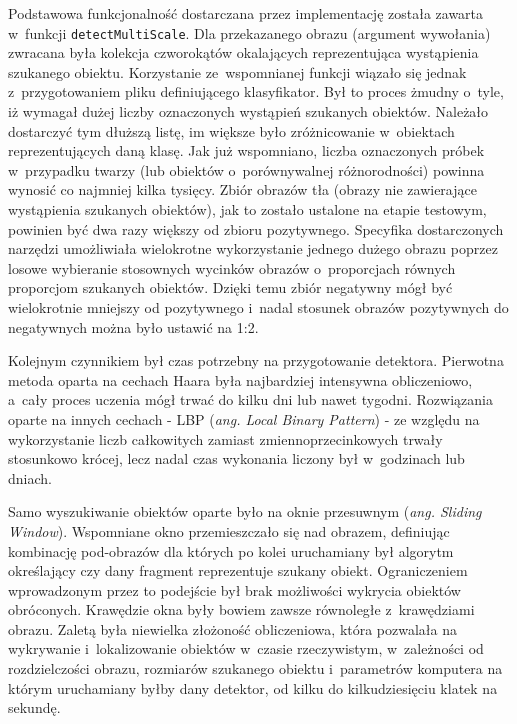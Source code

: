 Podstawowa funkcjonalność dostarczana przez implementację została zawarta
w~funkcji \verb|detectMultiScale|\cite{OCV:cascadeclassification}.
Dla przekazanego obrazu (argument wywołania)
zwracana była kolekcja czworokątów okalających
reprezentująca wystąpienia szukanego obiektu.
Korzystanie ze~wspomnianej funkcji wiązało się jednak z~przygotowaniem pliku
definiującego klasyfikator. Był to proces żmudny o~tyle, iż wymagał
dużej liczby oznaczonych wystąpień szukanych obiektów. Należało dostarczyć
tym dłuższą listę, im większe było zróżnicowanie w~obiektach reprezentujących
daną klasę. Jak już wspomniano, liczba oznaczonych próbek
w~przypadku twarzy (lub obiektów o~porównywalnej
różnorodności) powinna wynosić
co najmniej kilka tysięcy. Zbiór obrazów tła (obrazy nie zawierające 
wystąpienia szukanych obiektów), jak to zostało ustalone
na etapie testowym, powinien być dwa razy większy od zbioru 
pozytywnego. Specyfika dostarczonych narzędzi umożliwiała
wielokrotne wykorzystanie jednego dużego obrazu poprzez
losowe wybieranie stosownych wycinków obrazów o~proporcjach 
równych proporcjom szukanych obiektów. Dzięki temu
zbiór negatywny mógł być wielokrotnie mniejszy od pozytywnego 
i~nadal stosunek obrazów pozytywnych do negatywnych można 
było ustawić na 1:2. 

Kolejnym czynnikiem był czas potrzebny na przygotowanie detektora.
Pierwotna metoda oparta na cechach Haara
była najbardziej intensywna obliczeniowo, a~cały proces uczenia
mógł trwać do kilku dni lub nawet tygodni. Rozwiązania oparte na innych cechach - LBP
(\textit{ang. Local Binary Pattern}) - ze względu na wykorzystanie
liczb całkowitych zamiast zmiennoprzecinkowych trwały stosunkowo krócej, 
lecz nadal czas wykonania liczony był w~godzinach lub dniach.

Samo wyszukiwanie obiektów oparte było na oknie przesuwnym
(\textit{ang. Sliding Window}). Wspomniane okno przemieszczało się nad
obrazem, definiując kombinację pod-obrazów dla których po kolei uruchamiany
był algorytm określający czy dany fragment reprezentuje szukany obiekt.
Ograniczeniem wprowadzonym przez to podejście był brak możliwości
wykrycia obiektów obróconych. Krawędzie okna były bowiem zawsze równoległe
 z~krawędziami
obrazu. Zaletą była niewielka złożoność obliczeniowa, która pozwalała
na wykrywanie i~lokalizowanie obiektów w~czasie rzeczywistym, w~zależności
od rozdzielczości obrazu, rozmiarów szukanego obiektu i~parametrów
komputera na którym uruchamiany byłby dany detektor, od kilku do kilkudziesięciu
klatek na sekundę.


